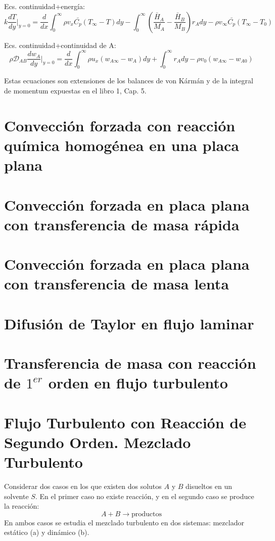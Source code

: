 Ecs. continuidad+energía:
\begin{equation}
    k \frac{dT}{dy} \bigg|_{y=0} = \frac{d}{dx} \int_{0}^{\infty} \rho v_x \bar{C_p} (T_{\infty} - T) dy
    - \int_{0}^{\infty} \left( \frac{\bar{H}_A}{M_A} - \frac{\bar{H}_B}{M_B} \right) r_A dy
    - \rho v_{\infty} \bar{C_p} (T_{\infty} - T_0) 
    \label{3.6}
\end{equation}

Ecs. continuidad+continuidad de A:
\begin{equation}
    \rho \mathscr {D}_{AB} \frac{dw_A}{dy} \bigg|_{y=0} = \frac{d}{dx} \int_{0}^{\infty} \rho u_x (w_{A\infty} - w_A) dy
    + \int_{0}^{\infty} r_A dy - \rho v_{0} (w_{A\infty} - w_{A0})
    \label{3.7}
\end{equation}

Estas ecuaciones son extensiones de los balances de von Kármán y de la integral de momentum expuestas en el libro 1, Cap. 5.

\section{Convección forzada con reacción química homogénea en una placa plana}
\section{Convección forzada en placa plana con transferencia de masa rápida}
\section{Convección forzada en placa plana con transferencia de masa lenta}
\section{Difusión de Taylor en flujo laminar}
\section{Transferencia de masa con reacción de $1^{er}$ orden en flujo turbulento}


\section{Flujo Turbulento con Reacción de Segundo Orden. Mezclado Turbulento}

Considerar dos casos en los que existen dos solutos $A$ y $B$ disueltos en un solvente $S$. En el primer caso no existe reacción, y en el segundo caso se produce la reacción:
\begin{equation*}
    A + B \rightarrow \text{productos}
\end{equation*}
En ambos casos se estudia el mezclado turbulento en dos sistemas: mezclador estático (a) y dinámico (b).

